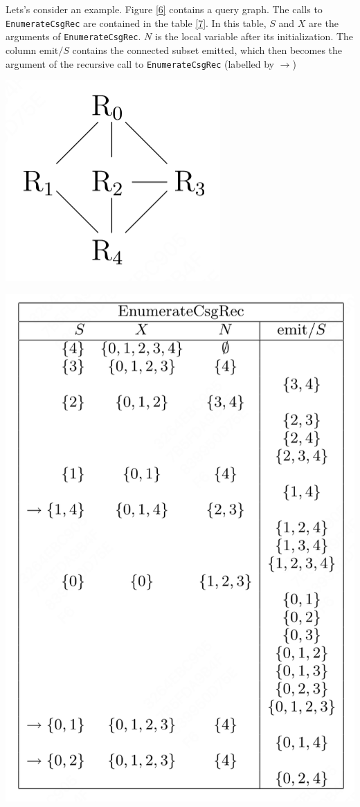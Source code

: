\documentclass[11pt]{article}
\begin{document}
Lets's consider an example. Figure \ref{6} contains a query graph. The calls to \texttt{EnumerateCsgRec} are
contained in the table \ref{7}. In this table, \(S\) and \(X\) are the arguments of \texttt{EnumerateCsgRec}.
\(N\) is the local variable after its initialization. The column \(\text{emit}/S\) contains the
connected subset emitted, which then becomes the argument of the recursive call to \texttt{EnumerateCsgRec}
(labelled by \(\to\))

\begin{center}
\includegraphics[width=.5\textwidth]{../../images/papers/103.png}
\end{center}


\begin{center}
\includegraphics[width=.8\textwidth]{../../images/papers/102.png}
\end{center}
\end{document}
